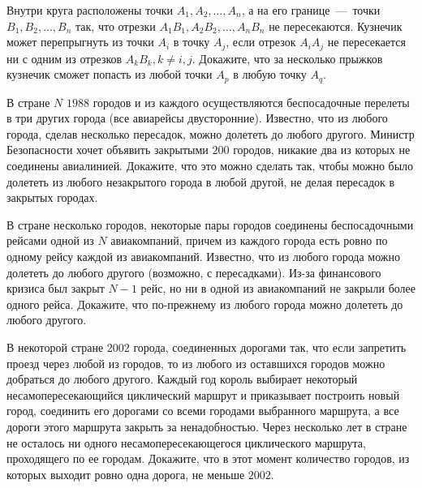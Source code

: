 \begin{exersize}
	Внутри круга расположены точки $A_1, A_2, \dots, A_n$, а на его границе~---~точки $B_1, B_2, \dots, B_n$ так, что отрезки $A_1B_1, A_2B_2, \dots, A_nB_n$ не пересекаются. Кузнечик может перепрыгнуть из точки $A_i$ в точку $A_j$, если отрезок $A_iA_j$ не пересекается ни с одним из отрезков $A_kB_k, k \neq i, j$. Докажите, что за несколько прыжков кузнечик сможет попасть из любой точки $A_p$ в любую точку $A_q$.
\end{exersize}	

\begin{exersize}
	В стране $N$ $1988$ городов и из каждого осуществляются беспосадочные перелеты в три других города (все авиарейсы двусторонние). Известно, что из любого города, сделав несколько пересадок, можно долететь до любого другого. Министр Безопасности хочет объявить закрытыми $200$ городов, никакие два из которых не соединены авиалинией. Докажите, что это можно сделать так, чтобы можно было долететь из любого незакрытого города в любой другой, не делая пересадок в закрытых городах.
\end{exersize}	 

\begin{exersize}
	В стране несколько городов, некоторые пары городов соединены беспосадочными рейсами одной из $N$ авиакомпаний, причем из каждого города есть ровно по одному рейсу каждой из авиакомпаний. Известно, что из любого города можно долететь до любого другого (возможно, с пересадками). Из-за финансового кризиса был закрыт $N-1$ рейс, но ни в одной из авиакомпаний не закрыли более одного рейса. Докажите, что по-прежнему из любого города можно долететь до любого другого.
\end{exersize}	 

\begin{exersize}
	В некоторой стране $2002$ города, соединенных дорогами так, что если запретить проезд через любой из городов, то из любого из оставшихся городов можно добраться до любого другого. Каждый год король выбирает некоторый несамопересекающийся циклический маршрут и приказывает построить новый город, соединить его дорогами со всеми городами выбранного маршрута, а все дороги этого маршрута закрыть за ненадобностью. Через несколько лет в стране не осталось ни одного несамопересекающегося циклического маршрута, проходящего по ее городам. Докажите, что в этот момент количество городов, из которых выходит ровно одна дорога, не меньше $2002$.
\end{exersize}	 

